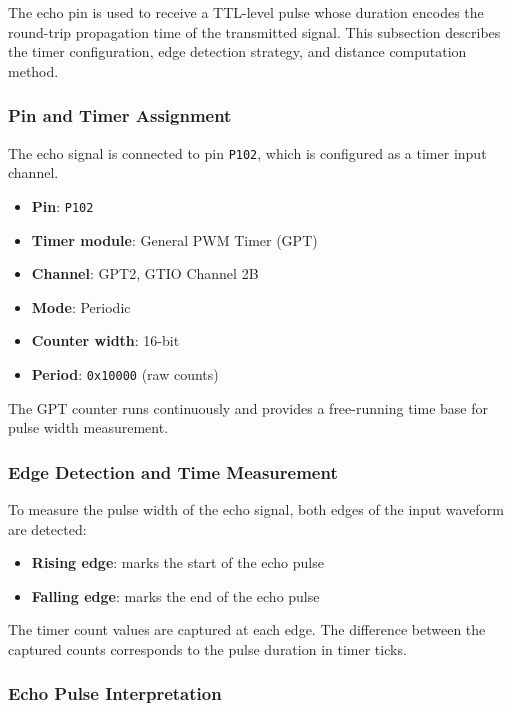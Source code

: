 \documentclass[12pt]{article}
\begin{document}
The echo pin is used to receive a TTL-level pulse whose duration encodes the round-trip propagation time of the transmitted signal. This subsection describes the timer configuration, edge detection strategy, and distance computation method.

\subsubsection{Pin and Timer Assignment}

The echo signal is connected to pin \texttt{P102}, which is configured as a timer input channel.

\begin{itemize}
    \item \textbf{Pin}: \texttt{P102}
    \item \textbf{Timer module}: General PWM Timer (GPT)
    \item \textbf{Channel}: GPT2, GTIO Channel 2B
    \item \textbf{Mode}: Periodic
    \item \textbf{Counter width}: 16-bit
    \item \textbf{Period}: \texttt{0x10000} (raw counts)
\end{itemize}

The GPT counter runs continuously and provides a free-running time base for pulse width measurement.

\subsubsection{Edge Detection and Time Measurement}

To measure the pulse width of the echo signal, both edges of the input waveform are detected:

\begin{itemize}
    \item \textbf{Rising edge}: marks the start of the echo pulse
    \item \textbf{Falling edge}: marks the end of the echo pulse
\end{itemize}

The timer count values are captured at each edge. The difference between the captured counts corresponds to the pulse duration in timer ticks.

\subsubsection{Echo Pulse Interpretation}
\end{document}
